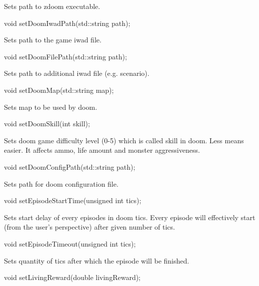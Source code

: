 Sets path to zdoom executable.


\vspace{20pt}
\begin{clinee}
void setDoomIwadPath(std::string path);
\end{clinee}

Sets path to the game iwad file.


\vspace{20pt}
\begin{clinee}
void setDoomFilePath(std::string path);
\end{clinee}

Sets path to additional iwad file (e.g. scenario).


\vspace{20pt}
\begin{clinee}
void setDoomMap(std::string map);
\end{clinee}

Sets map to be used by doom.


\vspace{20pt}
\begin{clinee}      
void setDoomSkill(int skill);
\end{clinee}

Sets doom game difficulty level (0-5) which is called skill in doom. Less means easier. It affects ammo, life amount and monster aggressiveness.


\vspace{20pt}
\begin{clinee}
void setDoomConfigPath(std::string path);
\end{clinee}

Sets path for doom configuration file.


\vspace{20pt}
\begin{clinee}    
void setEpisodeStartTime(unsigned int tics);
\end{clinee}

Sets start delay of every episodes in doom tics. Every episode will effectively start (from the user's perspective) after given number of tics.


\vspace{20pt}
\begin{clinee}
void setEpisodeTimeout(unsigned int tics);
\end{clinee}

Sets quantity of tics after which the episode will be finished.


\vspace{20pt}
\begin{clinee}
void setLivingReward(double livingReward);
\end{clinee}

